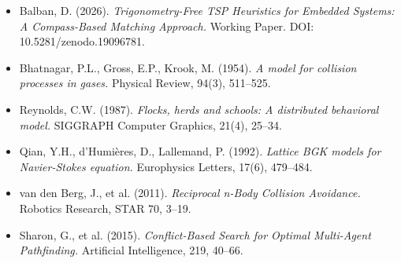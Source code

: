 \documentclass[11pt,a4paper]{article}
\begin{document}
\begin{itemize}[itemsep=2pt,leftmargin=*]
\item Balban, D. (2026). \textit{Trigonometry-Free TSP Heuristics for Embedded Systems:
A Compass-Based Matching Approach.} Working Paper. DOI: 10.5281/zenodo.19096781.
\item Bhatnagar, P.L., Gross, E.P., Krook, M. (1954). \textit{A model for collision processes
in gases.} Physical Review, 94(3), 511--525.
\item Reynolds, C.W. (1987). \textit{Flocks, herds and schools: A distributed behavioral model.}
SIGGRAPH Computer Graphics, 21(4), 25--34.
\item Qian, Y.H., d'Humi\`eres, D., Lallemand, P. (1992). \textit{Lattice BGK models
for Navier-Stokes equation.} Europhysics Letters, 17(6), 479--484.
\item van den Berg, J., et al. (2011). \textit{Reciprocal n-Body Collision Avoidance.}
Robotics Research, STAR 70, 3--19.
\item Sharon, G., et al. (2015). \textit{Conflict-Based Search for Optimal Multi-Agent Pathfinding.}
Artificial Intelligence, 219, 40--66.
\end{itemize}
\end{document}
